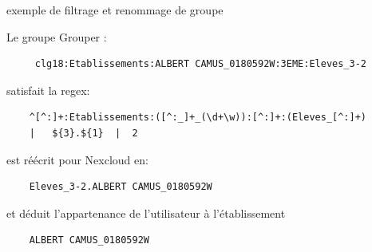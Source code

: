 \begin{frame}[fragile]{\sub} %
{exemple de filtrage et renommage de groupe}
\begin{list}{}{}
	\item {\tiny Le groupe Grouper :}
\begin{verbatim}
     clg18:Etablissements:ALBERT CAMUS_0180592W:3EME:Eleves_3-2
\end{verbatim}
\item {\tiny satisfait la regex:}
\begin{verbatim}
    ^[^:]+:Etablissements:([^:_]+_(\d+\w)):[^:]+:(Eleves_[^:]+) 
    |   ${3}.${1}  |  2
\end{verbatim}
\item {\tiny est réécrit pour Nexcloud en:}
\begin{verbatim}
    Eleves_3-2.ALBERT CAMUS_0180592W
\end{verbatim}
\item {\tiny et déduit l’appartenance de l'utilisateur à l'établissement}
\begin{verbatim}
    ALBERT CAMUS_0180592W
\end{verbatim}
\end{list}
\end{frame}


